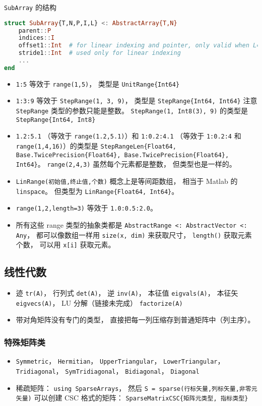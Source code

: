 \verb|SubArray| 的结构
\begin{lstlisting}[language=julia]
struct SubArray{T,N,P,I,L} <: AbstractArray{T,N}
    parent::P
    indices::I
    offset1::Int  # for linear indexing and pointer, only valid when L==true
    stride1::Int  # used only for linear indexing
    ...
end
\end{lstlisting}

\begin{itemize}
\item \verb|1:5| 等效于 \verb|range(1,5)|， 类型是 \verb|UnitRange{Int64}|
\item \verb|1:3:9| 等效于 \verb|StepRange(1, 3, 9)|， 类型是 \verb|StepRange{Int64, Int64}| 注意 \verb|StepRange| 类型的参数只能是整数。 \verb|StepRange(1, Int8(3), 9)| 的类型是 \verb|StepRange{Int64, Int8}|
\item \verb|1.2:5.1| （等效于 \verb|range(1.2,5.1)|）和 \verb|1:0.2:4.1| （等效于 \verb|1:0.2:4| 和 \verb|range(1,4,16)|）的类型是 \verb|StepRangeLen{Float64, Base.TwicePrecision{Float64}, Base.TwicePrecision{Float64}, Int64}|。 \verb|range(2,4,3)| 虽然每个元素都是整数， 但类型也是一样的。
\item \verb|LinRange(初始值,终止值,个数)| 概念上是等间距数组， 相当于 Matlab 的 \verb|linspace|。 但类型为 \verb|LinRange{Float64, Int64}|。
\item \verb|range(1,2,length=3)| 等效于 \verb|1.0:0.5:2.0|。
\item 所有这些 range 类型的抽象类都是 \verb|AbstractRange <: AbstractVector <: Any|， 都可以像数组一样用 \verb|size(x, dim)| 来获取尺寸， \verb|length()| 获取元素个数， 可以用 \verb|x[i]| 获取元素。
\end{itemize}


\subsection{线性代数}
\begin{itemize}
\item 迹 \verb|tr(A)|， 行列式 \verb|det(A)|， 逆 \verb|inv(A)|， 本征值 \verb|eigvals(A)|， 本征矢 \verb|eigvecs(A)|， LU 分解（链接未完成） \verb|factorize(A)|
\item 带对角矩阵没有专门的类型， 直接把每一列压缩存到普通矩阵中（列主序）。
\end{itemize}

\subsubsection{特殊矩阵类}
\begin{itemize}
\item \verb|Symmetric|， \verb|Hermitian|， \verb|UpperTriangular|， \verb|LowerTriangular|， \verb|Tridiagonal|， \verb|SymTridiagonal|， \verb|Bidiagonal|， \verb|Diagonal|
\item 稀疏矩阵： \verb|using SparseArrays|， 然后 \verb|S = sparse(行标矢量,列标矢量,非零元矢量)| 可以创建 CSC 格式的矩阵： \verb|SparseMatrixCSC{矩阵元类型, 指标类型}|
\end{itemize}

